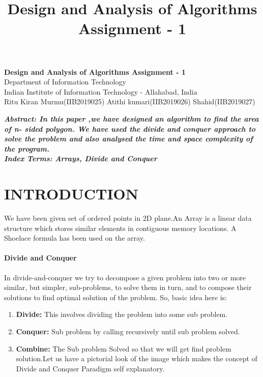\documentclass[10pt]{article}
\author{}
\title{\Large{Design and Analysis of Algorithms Assignment - 1}}
\begin{document}
	\begin{center}
		{\Large \textbf{Design and Analysis of Algorithms Assignment - 1}}\\
		\vspace{1em}
		{\large Department of Information Technology}\\
		\vspace{1em}
		\large{Indian Institute of Information Technology - Allahabad, India}\\
		\vspace{1em}
		\large{ Ritu Kiran Murmu(IIB2019025)      Atithi kumari(IIB2019026)     Shahid(IIB2019027)}
		\vspace{2.5em}
		
	\end{center}
	
\begin{multicols*}{2}

    \textbf{\emph{{Abstract}: In this paper ,we have designed an algorithm to find  the area of n- sided polygon. We have used the divide and conquer approach to solve the problem and also analysed the time and space complexity of the program.
}}\\
	
	\textbf{\emph{{Index Terms}: Arrays, Divide and Conquer\\}}


\section*{INTRODUCTION}
 
We have been given set of ordered points in 2D plane.An Array is a linear data structure which stores similar elements in contiguous memory locations. A Shoelace formula has been used on the array.

\paragraph{Divide and Conquer}
In divide-and-conquer  we try to decompose a given problem into two or more similar, but simpler, sub-problems, to solve them in turn, and to compose their solutions to find optimal solution of the problem. So, basic idea here is: 
\begin{enumerate}
    \item\textbf{Divide:} This involves dividing the problem into some sub problem.
    \item\textbf{Conquer:} Sub problem by calling recursively until sub problem solved.
    \item\textbf{Combine:} The Sub problem Solved so that we will get find problem solution.Let us have a pictorial look of the image which makes the concept of Divide and Conquer Paradigm self explanatory.\\\\
\end{enumerate}


\end{multicols*}
\end{document}
